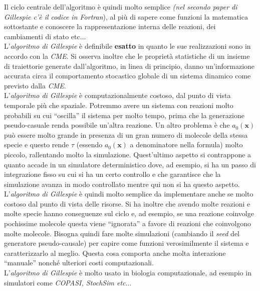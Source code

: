 \documentclass[a4paper,12pt, oneside]{book}
\begin{document}
Il ciclo centrale dell'algoritmo è quindi molto semplice \textit{(nel secondo
  paper di Gillespie c'è il codice in \emph{Fortran}}), al più di sapere come
funzioni la matematica sottostante e conoscere la rappresentazione interna
delle reazioni, dei cambiamenti di stato etc$\ldots$\\
L'\textit{algoritmo di Gillespie} è definibile \textbf{esatto} in quanto
le sue realizzazioni sono in accordo con la \textit{CME}. Si osserva inoltre che
le proprietà statistiche di un insieme di traiettorie generate dall'algoritmo,
in linea di principio, danno un'informazione accurata circa il comportamento
stocastico globale di un sistema dinamico come previsto dalla \textit{CME}.\\
L'\textit{algoritmo di Gillespie} è computazionalmente costoso, dal punto di
vista temporale più che spaziale. Potremmo avere un sistema con reazioni molto
probabili su cui ``oscilla'' il sistema per molto tempo, prima che la
generazione pseudo-casuale renda possibile un'altra reazione. Un altro problema
è che $a_0(\mathbf{x})$ può essere molto grande in presenza di un gran numero di
molecole della stessa specie e questo rende $\tau$ (essendo $a_0(\mathbf{x})$ a
denominatore nella formula) molto piccolo, rallentando molto la
simulazione. Quest'ultimo aspetto si contrappone a quanto accade in un
simulatore deterministico dove, ad esempio, si ha un passo di integrazione fisso
su cui si ha un certo controllo e che garantisce che la simulazione avanza in
modo controllato mentre qui non si ha questo aspetto.\\
L'\textit{algoritmo di Gillespie} è quindi molto semplice da implementare anche
se molto costoso dal punto di vista delle risorse. Si ha inoltre che avendo
molte reazioni e molte specie hanno conseguenze sul ciclo e, ad esempio, se una
reazione coinvolge pochissime molecole questa viene ``ignorata'' a favore di
reazioni che coinvolgono molte molecole. Bisogna quindi fare molte simulazioni
(cambiando il \textit{seed} del generatore pseudo-causale) per capire come
funzioni verosimilmente il sistema e caratterizzarlo al meglio. Questa cosa
comporta anche molta interazione ``manuale'' nonché ulteriori costi
computazionali.\\
L'\textit{algoritmo di Gillespie} è molto usato in biologia computazionale, ad
esempio in simulatori come \textit{COPASI, StochSim etc$\ldots$}
\end{document}
